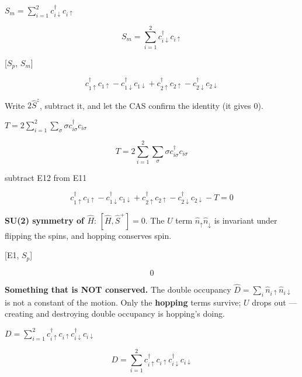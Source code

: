 \documentclass[dvipdfmx]{article}
\begin{document}
$S_m = \sum_{i=1}^{2} c^\dagger_{i\downarrow} c_{i\uparrow}$

\begin{equation}
  S_m = \sum_{i=1}^{2} c^\dagger_{i\downarrow} c_{i\uparrow}
  \label{eq:E10}
\end{equation}

[$S_p$, $S_m$]

\begin{equation}
  {c}_{1{\uparrow}}^{\dagger} {c}_{1{\uparrow}} - {c}_{1{\downarrow}}^{\dagger} {c}_{1{\downarrow}} + {c}_{2{\uparrow}}^{\dagger} {c}_{2{\uparrow}} - {c}_{2{\downarrow}}^{\dagger} {c}_{2{\downarrow}}
  \label{eq:E11}
\end{equation}

Write $2\hat S^z$, subtract it, and let the CAS confirm the identity (it gives 0).

$T = 2 \sum_{i=1}^{2} \sum_{\sigma} \sigma c^\dagger_{i\sigma} c_{i\sigma}$

\begin{equation}
  T = 2 \sum_{i=1}^{2} \sum_{\sigma} \sigma c^\dagger_{i\sigma} c_{i\sigma}
  \label{eq:E12}
\end{equation}

subtract E12 from E11

\begin{equation}
  {c}_{1{\uparrow}}^{\dagger} {c}_{1{\uparrow}} - {c}_{1{\downarrow}}^{\dagger} {c}_{1{\downarrow}} + {c}_{2{\uparrow}}^{\dagger} {c}_{2{\uparrow}} - {c}_{2{\downarrow}}^{\dagger} {c}_{2{\downarrow}} - T = 0
  \label{eq:E13}
\end{equation}

\textbf{SU(2) symmetry of $\hat H$}: $[\hat H,\hat S^+]=0$. The $U$ term $\hat n_\uparrow\hat n_\downarrow$ is invariant under flipping the spins, and hopping conserves spin.

[E1, $S_p$]

\begin{equation}
  0
  \label{eq:E14}
\end{equation}

\textbf{Something that is NOT conserved.} The double occupancy $\hat D=\sum_i\hat n_{i\uparrow}\hat n_{i\downarrow}$ is not a constant of the motion. Only the \textbf{hopping} terms survive; $U$ drops out — creating and destroying double occupancy is hopping's doing.

$D = \sum_{i=1}^{2} c^\dagger_{i\uparrow} c_{i\uparrow} c^\dagger_{i\downarrow} c_{i\downarrow}$

\begin{equation}
  D = \sum_{i=1}^{2} c^\dagger_{i\uparrow} c_{i\uparrow} c^\dagger_{i\downarrow} c_{i\downarrow}
  \label{eq:E15}
\end{equation}
\end{document}
